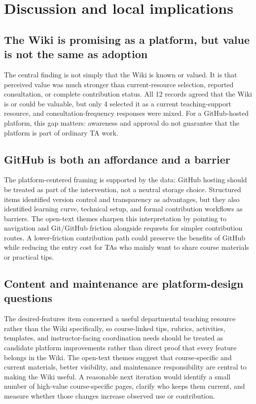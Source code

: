 \documentclass[11pt]{article}
\begin{document}
\section{Discussion and local implications}
\subsection{The Wiki is promising as a platform, but value is not the same as adoption}
The central finding is not simply that the Wiki is known or valued. It is that perceived value was much stronger than current-resource selection, reported consultation, or complete contribution status. All 12 records agreed that the Wiki is or could be valuable, but only 4 selected it as a current teaching-support resource, and consultation-frequency responses were mixed. For a GitHub-hosted platform, this gap matters: awareness and approval do not guarantee that the platform is part of ordinary TA work.

\subsection{GitHub is both an affordance and a barrier}
The platform-centered framing is supported by the data: GitHub hosting should be treated as part of the intervention, not a neutral storage choice. Structured items identified version control and transparency as advantages, but they also identified learning curve, technical setup, and formal contribution workflows as barriers. The open-text themes sharpen this interpretation by pointing to navigation and Git/GitHub friction alongside requests for simpler contribution routes. A lower-friction contribution path could preserve the benefits of GitHub while reducing the entry cost for TAs who mainly want to share course materials or practical tips.

\subsection{Content and maintenance are platform-design questions}
The desired-features item concerned a useful departmental teaching resource rather than the Wiki specifically, so course-linked tips, rubrics, activities, templates, and instructor-facing coordination needs should be treated as candidate platform improvements rather than direct proof that every feature belongs in the Wiki. The open-text themes suggest that course-specific and current materials, better visibility, and maintenance responsibility are central to making the Wiki useful. A reasonable next iteration would identify a small number of high-value course-specific pages, clarify who keeps them current, and measure whether those changes increase observed use or contribution.
\end{document}
